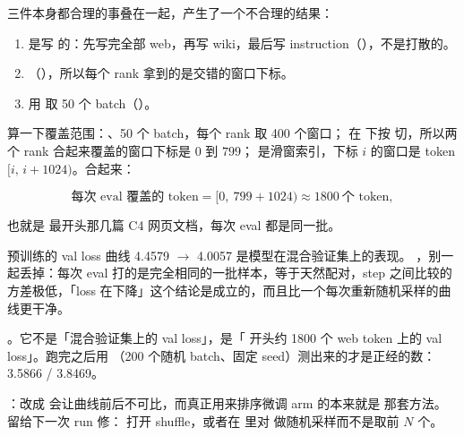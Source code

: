 三件本身都合理的事叠在一起，产生了一个不合理的结果：

\begin{enumerate}[label=(\arabic*)]\itemsep3pt
  \item {} 是写  的：先写完全部 web，再写 wiki，最后写 instruction（），不是打散的。
  \item {}（），所以每个 rank 拿到的是交错的窗口下标。
  \item {} 用  取 50 个 batch（）。
\end{enumerate}

算一下覆盖范围：、50 个 batch，每个 rank 取 400 个窗口； 在  下按  切，所以两个 rank 合起来覆盖的窗口下标是 $0$ 到 $799$； 是滑窗索引，下标 $i$ 的窗口是 token $[i,\,i+1024)$。合起来：

\[
\mbox{每次 eval 覆盖的 token} = [0,\ 799+1024) \approx 1800\ \mbox{个 token},
\]

也就是  最开头那几篇 C4 网页文档，每次 eval 都是同一批。

\begin{retraction}{预训练的 val loss 曲线 4.4579 $\to$ 4.0057 是模型在混合验证集上的表现。}
，别一起丢掉：每次 eval 打的是完全相同的一批样本，等于天然配对，step 之间比较的方差极低，「loss 在下降」这个结论是成立的，而且比一个每次重新随机采样的曲线更干净。

。它不是「混合验证集上的 val loss」，是「 开头约 1800 个 web token 上的 val loss」。跑完之后用 （200 个随机 batch、固定 seed）测出来的才是正经的数： 3.5866 /  3.8469。

：改成  会让曲线前后不可比，而真正用来排序微调 arm 的本来就是  那套方法。留给下一次 run 修： 打开 shuffle，或者在  里对  做随机采样而不是取前 $N$ 个。
\end{retraction}

